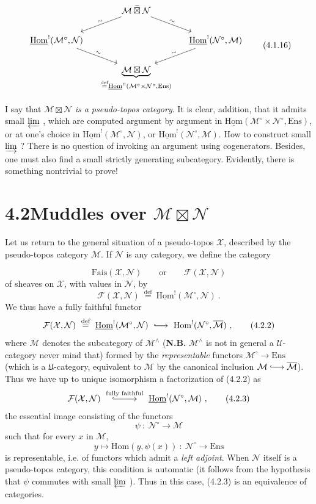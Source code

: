 \documentclass[11pt]{article}
\newcommand{\printedpage}[1]{\marginpar{\footnotesize p.~#1}}
\newcommand{\msp}[1]{\marginpar{\footnotesize [#1]}}
\newcommand{\cM}{\mathcal{M}}
\newcommand{\cN}{\mathcal{N}}
\newcommand{\cX}{\mathcal{X}}
\newcommand{\cF}{\mathcal{F}}
\newcommand{\uHom}{\underline{\mathrm{Hom}}}
\newcommand{\Hom}{\mathrm{Hom}}
\newcommand{\Ens}{\mathrm{Ens}}
\newcommand{\defeq}{\overset{\text{def}}{=}}
\newcommand{\bt}{\boxtimes}
\newcommand{\tbt}{\mathbin{\widetilde{\boxtimes}}}
\newcommand{\linj}{\lhook\joinrel\longrightarrow}
\begin{document}
\printedpage{4}

\msp{page 57}

\[
\begin{tikzcd}[column sep=small]
 & \cM \tbt \cN \arrow[dl, "\sim" sloped] \arrow[dr, "\sim" sloped] & \\
\uHom^{!}(\cM^{\circ},\cN) \arrow[dr, "\sim" sloped] & & \uHom^{!}(\cN^{\circ},\cM) \arrow[dl, "\sim" sloped] \\
 & \underbrace{\cM \bt \cN}_{\defeq \uHom^{!!}(\cM^{\circ}\times\cN^{\circ},\Ens)} &
\end{tikzcd}
\tag*{(4.1.16)}
\]



I say that $\cM \bt \cN$ \textit{is a pseudo-topos category}. It is clear, addition, that it admits small $\varprojlim$ , which are computed argument by argument in $\uHom(\cM^{\circ}\times\cN^{\circ},\Ens)$, or at one's choice in $\uHom^{!}(\cM^{\circ},\cN)$, or $\uHom^{!}(\cN^{\circ},\cM)$. How to construct small $\varinjlim$ ? There is no question of invoking an argument using cogenerators. Besides, one must also find a small strictly generating subcategory. Evidently, there is something nontrivial to prove!

\section*{4.2\quad Muddles over $\cM \bt \cN$}

Let us return to the general situation of a pseudo-topos $\cX$, described by the pseudo-topos category $\cM$. If $\cN$ is any category, we define the category

\msp{page 58}
\[
\mathrm{Fais}(\cX,\cN) \qquad \text{or} \qquad \cF(\cX,\cN)
\]
of sheaves on $\cX$, with values in $\cN$, by
\[
\cF(\cX,\cN) \ \defeq\ \uHom^{!}(\cM^{\circ},\cN) \ .
\tag*{(4.2.1)}
\]
We thus have a fully faithful functor
\[
\cF(\cX,\cN) \ \defeq\ \uHom^{!}(\cM^{\circ},\cN) \ \linj\ \Hom^{!}(\cN^{\circ},\overline{\cM}) \ ,
\tag*{(4.2.2)}
\]
where $\overline{\cM}$ denotes the subcategory of $\cM^{\wedge}$ (\textbf{N.B.} $\cM^{\wedge}$ is not in general a $\mathcal{U}$-category never mind that) formed by the \textit{representable} functors $\cM^{\circ}\longrightarrow\Ens$ (which is a $\mathfrak{U}$-category, equivalent to $\cM$ by the canonical inclusion $\cM \linj \overline{\cM}$). Thus we have up to unique isomorphism a factorization of (4.2.2) as
\[
\cF(\cX,\cN) \ \overset{\text{fully faithful}}{\lhook\joinrel\relbar\joinrel\relbar\joinrel\longrightarrow}\ \uHom^{!}(\cN^{\circ},\cM) \ ,
\tag*{(4.2.3)}
\]
the essential image consisting of the functors
\[
\psi \ :\ \cN^{\circ} \longrightarrow \cM
\]
such that for every $x$ in $\cM$,
\[
y \longmapsto \Hom(y,\psi(x)) \ :\ \cN^{\circ} \longrightarrow \Ens
\]
is representable, i.e. of functors which
\printedpage{5}
\msp{page 59}
admit a \textit{left adjoint}. When $\cN$ itself is a pseudo-topos category, this condition is automatic (it follows from the hypothesis that $\psi$ commutes with small $\varprojlim$ ). Thus in this case, (4.2.3) is an equivalence of categories.
\end{document}
